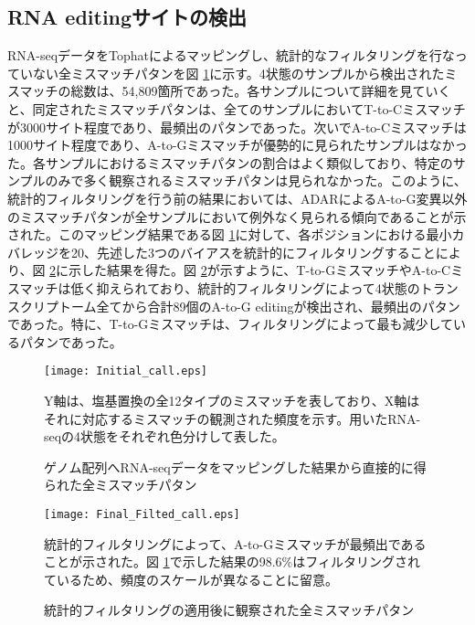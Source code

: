 \subsection{RNA editingサイトの検出}
RNA-seqデータをTophatによるマッピングし、統計的なフィルタリングを行なっていない全ミスマッチパタンを図 \ref{fig:initial}に示す。4状態のサンプルから検出されたミスマッチの総数は、54,809箇所であった。各サンプルについて詳細を見ていくと、同定されたミスマッチパタンは、全てのサンプルにおいてT-to-Cミスマッチが3000サイト程度であり、最頻出のパタンであった。次いでA-to-Cミスマッチは1000サイト程度であり、A-to-Gミスマッチが優勢的に見られたサンプルはなかった。各サンプルにおけるミスマッチパタンの割合はよく類似しており、特定のサンプルのみで多く観察されるミスマッチパタンは見られなかった。このように、統計的フィルタリングを行う前の結果においては、ADARによるA-to-G変異以外のミスマッチパタンが全サンプルにおいて例外なく見られる傾向であることが示された。このマッピング結果である図 \ref{fig:initial}に対して、各ポジションにおける最小カバレッジを20、先述した3つのバイアスを統計的にフィルタリングすることにより、図 \ref{fig:final}に示した結果を得た。図 \ref{fig:final}が示すように、T-to-GミスマッチやA-to-Cミスマッチは低く抑えられており、統計的フィルタリングによって4状態のトランスクリプトーム全てから合計89個のA-to-G editingが検出され、最頻出のパタンであった。特に、T-to-Gミスマッチは、フィルタリングによって最も減少しているパタンであった。
\begin{figure}[!h]
	\centering
		\texttt{[image: Initial\_call.eps]}
		\caption{ゲノム配列へRNA-seqデータをマッピングした結果から直接的に得られた全ミスマッチパタン}
		\begin{flushleft}
			\small{Y軸は、塩基置換の全12タイプのミスマッチを表しており、X軸はそれに対応するミスマッチの観測された頻度を示す。用いたRNA-seqの4状態をそれぞれ色分けして表した。}
		\end{flushleft}
		\label{fig:initial}
	\end{figure}
\begin{figure}[!h]
	\centering
	\texttt{[image: Final\_Filted\_call.eps]}
	\caption{統計的フィルタリングの適用後に観察された全ミスマッチパタン}
	\begin{flushleft}
		\small{統計的フィルタリングによって、A-to-Gミスマッチが最頻出であることが示された。図 \ref{fig:initial}で示した結果の98.6\%はフィルタリングされているため、頻度のスケールが異なることに留意。}
	\end{flushleft}
	\label{fig:final}
\end{figure}


